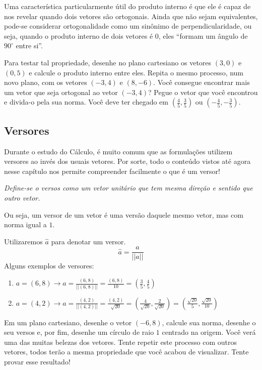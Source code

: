 \documentclass[
  portuguese,
  letterpaper,
  DIV=11,
  numbers=noendperiod]{scrreport}
\providecommand{\tightlist}{%
  \setlength{\itemsep}{0pt}\setlength{\parskip}{0pt}}
\begin{document}
Uma característica particularmente útil do produto interno é que ele é
capaz de nos revelar quando dois vetores são ortogonais. Ainda que não
sejam equivalentes, pode-se considerar ortogonalidade como um sinônimo
de perpendicularidade, ou seja, quando o produto interno de dois vetores
é 0, eles ``formam um ângulo de \(90^{\circ}\) entre si''.

Para testar tal propriedade, desenhe no plano cartesiano os vetores
\((3,0)\) e \((0,5)\) e calcule o produto interno entre eles. Repita o
mesmo processo, num novo plano, com os vetores \((-3,4)\) e \((8,-6)\).
Você consegue encontrar mais um vetor que seja ortogonal ao vetor
\((-3,4)\)? Pegue o vetor que você encontrou e divida-o pela sua norma.
Você deve ter chegado em \((\frac{4}{5}, \frac{3}{5})\) ou
\((-\frac{4}{5}, -\frac{3}{5})\).

\subsection{Versores}\label{versores}

Durante o estudo do Cálculo, é muito comum que as formulações utilizem
versores ao invés dos usuais vetores. Por sorte, todo o conteúdo vistos
até agora nesse capítulo nos permite compreender facilmente o que é um
versor!

\emph{Define-se o versos como um vetor unitário que tem mesma direção e
sentido que outro vetor.}

Ou seja, um versor de um vetor é uma versão daquele mesmo vetor, mas com
norma igual a \(1\).

Utilizaremos \(\hat{a}\) para denotar um versor. \[
\hat{a}=\frac{a}{||a||}
\] Alguns exemplos de versores:

\begin{enumerate}
\def\labelenumi{\arabic{enumi}.}
\tightlist
\item
  \(a = (6,8) \rightarrow \hat{a} = \frac{(6,8)}{||(6,8)||}=\frac{(6,8)}{10} = (\frac{3}{5}, \frac{4}{5})\)
\item
  \(a = (4,2) \rightarrow \hat{a} = \frac{(4,2)}{||(4,2)||}=\frac{(4,2)}{\sqrt{20}} = (\frac{4}{\sqrt{20}},
   \frac{2}{\sqrt{20}})=(\frac{\sqrt{20}}{5}, \frac{\sqrt{20}}{10})\)
\end{enumerate}

Em um plano cartesiano, desenhe o vetor \((-6,8)\), calcule sua norma,
desenhe o seu versos e, por fim, desenhe um círculo de raio \(1\)
centrado na origem. Você verá uma das muitas belezas dos vetores. Tente
repetir este processo com outros vetores, todos terão a mesma
propriedade que você acabou de visualizar. Tente provar esse resultado!
\end{document}
